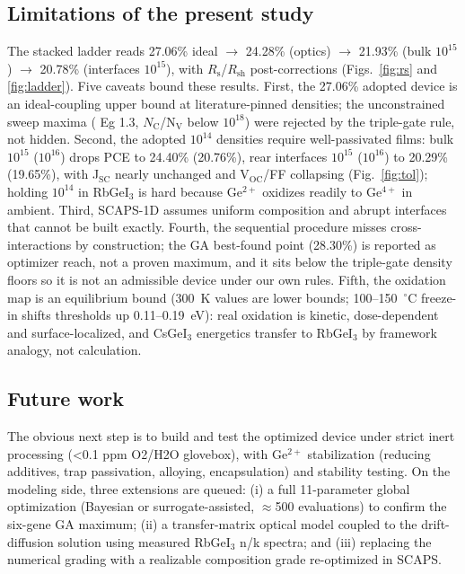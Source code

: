 \documentclass[aip,amsmath,amssymb,preprint]{revtex4-2}
\begin{document}
\subsection{Limitations of the present study}
The stacked ladder reads 27.06\% ideal $\rightarrow$ 24.28\% (optics) $\rightarrow$ 21.93\% (bulk $10^{15}$) $\rightarrow$ 20.78\% (interfaces $10^{15}$), with $R_{\mathrm{s}}$/$R_{\mathrm{sh}}$ post-corrections (Figs.~\ref{fig:rs} and \ref{fig:ladder}).
Five caveats bound these results. First, the 27.06\% adopted device is an ideal-coupling upper bound at literature-pinned densities; the unconstrained sweep maxima ( Eg 1.3, $N_{\mathrm{C}}$/N$_{\mathrm{V}}$ below $10^{18}$) were rejected by the triple-gate rule, not hidden. Second, the adopted $10^{14}$ densities require well-passivated films: bulk $10^{15}$ ($10^{16}$) drops PCE to 24.40\% (20.76\%), rear interfaces $10^{15}$ ($10^{16}$) to 20.29\% (19.65\%), with J$_{\mathrm{SC}}$ nearly unchanged and V$_{\mathrm{OC}}$/FF collapsing (Fig.~\ref{fig:tol}); holding $10^{14}$ in RbGeI$_{3}$ is hard because Ge$^{2+}$ oxidizes readily to Ge$^{4+}$ in ambient. Third, SCAPS-1D assumes uniform composition and abrupt interfaces that cannot be built exactly. Fourth, the sequential procedure misses cross-interactions by construction; the GA best-found point (28.30\%) is reported as optimizer reach, not a proven maximum, and it sits below the triple-gate density floors so it is not an admissible device under our own rules. Fifth, the oxidation map is an equilibrium bound (300~K values are lower bounds; 100--150~$^{\circ}$C freeze-in shifts thresholds up 0.11--0.19~eV): real oxidation is kinetic, dose-dependent and surface-localized, and CsGeI$_{3}$ energetics transfer to RbGeI$_{3}$ by framework analogy, not calculation.

\subsection{Future work}
The obvious next step is to build and test the optimized device under strict inert processing (<0.1 ppm O2/H2O glovebox), with Ge$^{2+}$ stabilization (reducing additives, trap passivation, alloying, encapsulation) and stability testing. On the modeling side, three extensions are queued: (i) a full 11-parameter global optimization (Bayesian or surrogate-assisted, $\approx$500 evaluations) to confirm the six-gene GA maximum; (ii) a transfer-matrix optical model coupled to the drift-diffusion solution using measured RbGeI$_{3}$ n/k spectra; and (iii) replacing the numerical grading with a realizable composition grade re-optimized in SCAPS.
\end{document}
